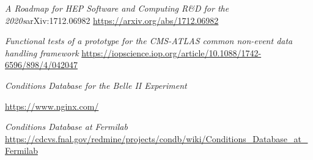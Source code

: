 \documentclass[pdftex,12pt,letter]{article}
\begin{document}


\clearpage
\begin{thebibliography}{1}

{\textit{A Roadmap for HEP Software and Computing R\&D for the 2020s}arXiv:1712.06982} \url{https://arxiv.org/abs/1712.06982}

{\textit{Functional tests of a prototype for the CMS-ATLAS common non-event data handling framework}} \url{https://iopscience.iop.org/article/10.1088/1742-6596/898/4/042047}

{\textit{Conditions Database for the Belle II Experiment}}

{\url{https://www.nginx.com/}}

{\textit{Conditions Database at Fermilab}  \url{https://cdcvs.fnal.gov/redmine/projects/condb/wiki/Conditions_Database_at_Fermilab}}

\end{thebibliography}
\end{document}

